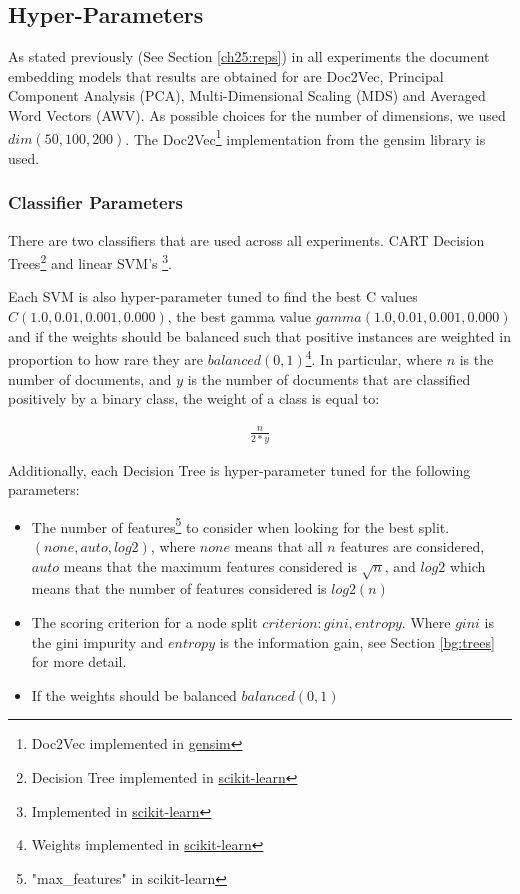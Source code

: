 \subsection{Hyper-Parameters}\label{ch3:hyperparam}

 As stated previously (See Section \ref{ch25:reps}) in all experiments the document embedding models that results are obtained for are Doc2Vec, Principal Component Analysis (PCA), Multi-Dimensional Scaling (MDS) and Averaged Word Vectors (AWV). As possible choices for the number of dimensions, we used ${dim} (50, 100, 200)$. The Doc2Vec\footnote{Doc2Vec implemented in \href{https://radimrehurek.com/gensim/models/doc2vec.html}{gensim}} implementation from the gensim library is used. 

\subsubsection{Classifier Parameters}

There are two classifiers that are used across all experiments. CART Decision Trees\footnote{Decision Tree implemented in \href{https://scikit-learn.org/stable/modules/generated/sklearn.tree.DecisionTreeClassifier.html}{scikit-learn}} and linear SVM's \footnote{Implemented in \href{https://scikit-learn.org/stable/modules/generated/sklearn.tree.DecisionTreeClassifier.html}{scikit-learn}}.

Each SVM is also hyper-parameter tuned to find the best C values    $ C (1.0, 0.01, 0.001, 0.000)$, the best gamma value $gamma (1.0, 0.01, 0.001, 0.000)$ and if the  weights should be balanced such that positive instances are weighted in proportion to how rare they are ${balanced} (0, 1)$\footnote{Weights implemented in  \href{https://scikit-learn.org/stable/modules/generated/sklearn.utils.class_weight.compute_class_weight.html}{scikit-learn}}. In particular, where $n$ is the number of documents, and $y$ is the number of documents that are classified positively by a binary class, the weight of a class is equal to:


\begin{align}
\frac{n}{2 * y} 
\end{align}


Additionally, each Decision Tree  is hyper-parameter tuned for the following parameters:
	
\begin{itemize}
	\item The number of features\footnote{"max\_features" in scikit-learn} to consider when looking for the best split. $(none, auto, log2)$, where $none$ means that all $n$ features are considered,  $auto$ means that the maximum features considered is $\sqrt{n}$, and $log2$ which means that the number of features considered is $log2(n)$
	\item The scoring criterion for a node split $criterion: gini, entropy$. Where $gini$ is the gini impurity and $entropy$ is the information gain, see Section \ref{bg:trees} for more detail.
	\item If the  weights should be balanced ${balanced} (0, 1)$
\end{itemize} 

